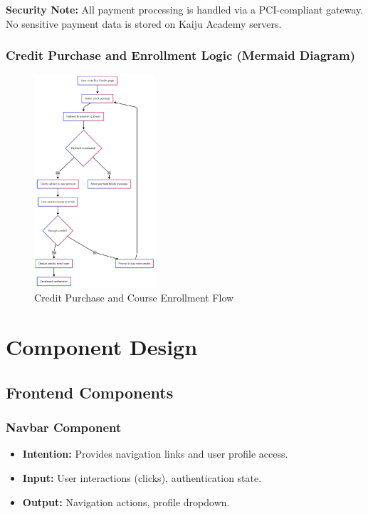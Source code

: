 \documentclass[a4paper, 11pt]{scrreprt}
\begin{document}
\textbf{Security Note:} All payment processing is handled via a PCI-compliant gateway. No sensitive payment data is stored on Kaiju Academy servers.

\subsection{Credit Purchase and Enrollment Logic (Mermaid Diagram)}

\begin{figure}[ht]
    \centering
    \includegraphics[width=0.4\textwidth]{img/credit_purchase_flow.png}
    \caption{Credit Purchase and Course Enrollment Flow}
\end{figure}


\chapter{Component Design}

\section{Frontend Components}

\subsection{Navbar Component}
\begin{itemize}
    \item \textbf{Intention:} Provides navigation links and user profile access.
    \item \textbf{Input:} User interactions (clicks), authentication state.
    \item \textbf{Output:} Navigation actions, profile dropdown.
\end{itemize}
\end{document}
